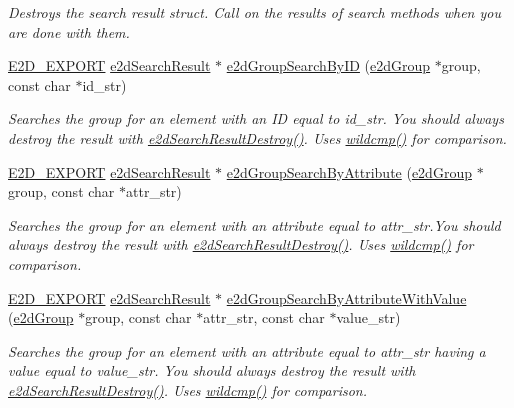 \begin{DoxyCompactItemize}
\begin{DoxyCompactList}\small\item\em Destroys the search result struct. Call on the results of search methods when you are done with them. \end{DoxyCompactList}\item 
\hyperlink{Ez2DS_8h_a9f14e9cb869e1a85fdaba03afcca0df9}{E2\-D\-\_\-\-E\-X\-P\-O\-R\-T} \hyperlink{structe2dSearchResult}{e2d\-Search\-Result} $\ast$ \hyperlink{group__e2dGroup_ga0c495948b5e2e14d004d1daacf4811af}{e2d\-Group\-Search\-By\-I\-D} (\hyperlink{structe2dGroup}{e2d\-Group} $\ast$group, const char $\ast$id\-\_\-str)
\begin{DoxyCompactList}\small\item\em Searches the group for an element with an I\-D equal to id\-\_\-str. You should always destroy the result with \hyperlink{group__e2dGroup_ga0775c9a7e2ec5311263f84339afb52bc}{e2d\-Search\-Result\-Destroy()}. Uses \hyperlink{Ez2DS_8h_a64615e3e2147eb59622dbbe4f7af2e5f}{wildcmp()} for comparison. \end{DoxyCompactList}\item 
\hyperlink{Ez2DS_8h_a9f14e9cb869e1a85fdaba03afcca0df9}{E2\-D\-\_\-\-E\-X\-P\-O\-R\-T} \hyperlink{structe2dSearchResult}{e2d\-Search\-Result} $\ast$ \hyperlink{group__e2dGroup_gab4ce5d4021112416fecd57eea234dfc9}{e2d\-Group\-Search\-By\-Attribute} (\hyperlink{structe2dGroup}{e2d\-Group} $\ast$group, const char $\ast$attr\-\_\-str)
\begin{DoxyCompactList}\small\item\em Searches the group for an element with an attribute equal to attr\-\_\-str.\-You should always destroy the result with \hyperlink{group__e2dGroup_ga0775c9a7e2ec5311263f84339afb52bc}{e2d\-Search\-Result\-Destroy()}. Uses \hyperlink{Ez2DS_8h_a64615e3e2147eb59622dbbe4f7af2e5f}{wildcmp()} for comparison. \end{DoxyCompactList}\item 
\hyperlink{Ez2DS_8h_a9f14e9cb869e1a85fdaba03afcca0df9}{E2\-D\-\_\-\-E\-X\-P\-O\-R\-T} \hyperlink{structe2dSearchResult}{e2d\-Search\-Result} $\ast$ \hyperlink{group__e2dGroup_ga7f7a0b0f0538109d19b8d52cf96a1cea}{e2d\-Group\-Search\-By\-Attribute\-With\-Value} (\hyperlink{structe2dGroup}{e2d\-Group} $\ast$group, const char $\ast$attr\-\_\-str, const char $\ast$value\-\_\-str)
\begin{DoxyCompactList}\small\item\em Searches the group for an element with an attribute equal to attr\-\_\-str having a value equal to value\-\_\-str. You should always destroy the result with \hyperlink{group__e2dGroup_ga0775c9a7e2ec5311263f84339afb52bc}{e2d\-Search\-Result\-Destroy()}. Uses \hyperlink{Ez2DS_8h_a64615e3e2147eb59622dbbe4f7af2e5f}{wildcmp()} for comparison. \end{DoxyCompactList}\end{DoxyCompactItemize}


